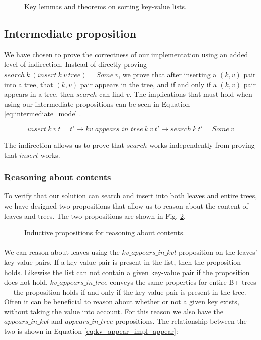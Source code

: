 \begin{figure}
  
  \caption{Key lemmas and theorems on sorting key-value lists.}
  \label{fig:key_sorting_lemmas}
\end{figure}

\subsection{Intermediate proposition}
\label{intermediate_prop}
We have chosen to prove the correctness of our implementation using an added level of indirection. Instead of directly proving $search~k~(insert~k~v~ tree) = Some~v$, we prove that after inserting a $(k, v)$ pair into a tree,
that $(k, v)$ pair appears in the tree, and if and only if a $(k, v)$ pair appears in a tree, then $search$ can find $v$. The implications that must hold when using our intermediate propositions can be seen in Equation \ref{eq:intermediate_model}.

\begin{equation}
  insert~k~v~t = t' \rightarrow kv\_appears\_in\_tree~k~v~t' \rightarrow search~k~t' = Some~v
  \label{eq:intermediate_model}
\end{equation}

The indirection allows us to prove that $search$ works independently from proving that $insert$ works.

\subsubsection{Reasoning about contents}
To verify that our solution can search and insert into both leaves and entire trees, we have designed two propositions that allow us to reason about the content of leaves and trees. The two propositions are shown in Fig. \ref{fig:aik_and_ait}. 

\begin{figure}
  
  \caption{Inductive propositions for reasoning about contents.}
  \label{fig:aik_and_ait}
\end{figure}

\paragraph{}
We can reason about leaves using the $kv\_appears\_in\_kvl$ proposition on the leaves' key-value pairs. If a key-value pair is present in the list, then the proposition holds. Likewise the list can not contain a given key-value pair if the proposition does not hold. $kv\_appears\_in\_tree$ conveys the same properties for entire B+ trees --- the proposition holds if and only if the key-value pair is present in the tree. Often it can be beneficial to reason about whether or not a given key exists, without taking the value into account. For this reason we also have the $appears\_in\_kvl$ and $appears\_in\_tree$ propositions. The relationship between the two is shown in Equation \ref{eq:kv_appear_impl_appear}: 

